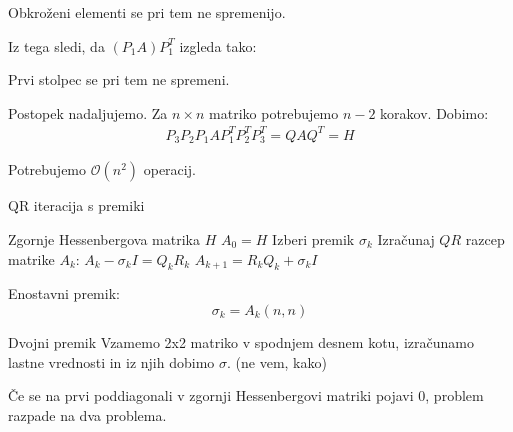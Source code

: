 \documentclass[a4paper,12pt]{article}
\theoremstyle{definition}
\theoremstyle{remark}
\newcounter{subsubsubsection}[subsubsection]
\begin{document}
Obkroženi elementi se pri tem ne spremenijo.

Iz tega sledi, da $(P_1 A) P_1^T$ izgleda tako:

\begin{center}
\end{center}

Prvi stolpec se pri tem ne spremeni.

Postopek nadaljujemo. Za $n \times n$ matriko potrebujemo $n-2$ korakov. Dobimo:
\begin{gather*}
    P_3 P_2 P_1 A P_1^T P_2^T P_3^T = Q A Q^T = H
\end{gather*}

Potrebujemo $\mathcal{O}(n^2)$ operacij.



\begin{algorithm}
    \caption{QR iteracija s premiki}
    \begin{algorithmic}[1]
    \Require Zgornje Hessenbergova matrika $H$
    \State $A_0 = H$
        \State Izberi premik $\sigma_k$
        \State Izračunaj $QR$ razcep matrike $A_k$: $A_k - \sigma_k I = Q_k R_k$
        \State $A_{k+1} = R_k Q_k + \sigma_k I$
    \EndWhile
    \end{algorithmic}
\end{algorithm}



Enostavni premik:
\begin{equation*}
    \sigma_k = A_k(n, n)
\end{equation*}

Dvojni premik
Vzamemo 2x2 matriko v spodnjem desnem kotu, izračunamo lastne vrednosti in iz njih dobimo $\sigma$. (ne vem, kako)

Če se na prvi poddiagonali v zgornji Hessenbergovi matriki pojavi 0, problem razpade na dva problema.
\end{document}
